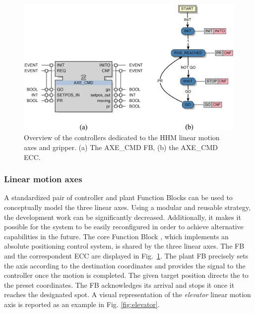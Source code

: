 \begin{bibunit}
\begin{figure}[h!]
    \centering
    \includegraphics[width=0.9\columnwidth]{MX_Papers/Paper4/pictures/lilli06.eps}
    \caption{Overview of the controllers dedicated to the HHM linear motion axes and gripper. (a) The AXE\_CMD FB, (b) the AXE\_CMD ECC.} 
    \label{fig:fbs}
\end{figure}

\subsubsection{Linear motion axes}
A standardized pair of controller and plant Function Blocks can be used to conceptually model the three linear axes.
Using a modular and reusable strategy, the development work can be significantly decreased. 
Additionally, it makes it possible for the system to be easily reconfigured in order to achieve alternative capabilities in the future.
The core Function Block , which implements an absolute positioning control system, is shared by the three linear axes. The FB and the correspondent ECC are displayed in \mbox{Fig. \ref{fig:fbs}}.
The plant FB precisely sets the axis according to the destination coordinates and provides the  signal to the controller once the motion is completed.
The given target position directs the  to the preset coordinates. The FB acknowledges its arrival and stops it once it reaches the designated spot. A visual representation of the \textit{elevator} linear motion axis is reported as an example in Fig. \ref{fig:elevator}.


\end{bibunit}
